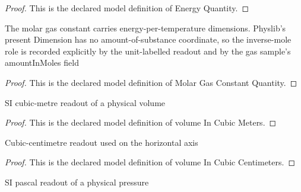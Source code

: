 \begin{proof}
  This is the declared model definition of Energy Quantity.
\end{proof}
\begin{definition}
  \label{def:physics:phyx-mini-0415:phyxminiproblems-problemphyxmini0415-molargasconstantquantity}
  The molar gas constant carries energy-per-temperature dimensions. Physlib's present Dimension has no amount-of-substance coordinate, so the inverse-mole role is recorded explicitly by the unit-labelled readout and by the gas sample's amountInMoles field
\end{definition}
\begin{proof}
  This is the declared model definition of Molar Gas Constant Quantity.
\end{proof}
\begin{definition}
  \label{def:physics:phyx-mini-0415:phyxminiproblems-problemphyxmini0415-volumeincubicmeters}
  SI cubic-metre readout of a physical volume
\end{definition}
\begin{proof}
  This is the declared model definition of volume In Cubic Meters.
\end{proof}
\begin{definition}
  \label{def:physics:phyx-mini-0415:phyxminiproblems-problemphyxmini0415-volumeincubiccentimeters}
  Cubic-centimetre readout used on the horizontal axis
\end{definition}
\begin{proof}
  This is the declared model definition of volume In Cubic Centimeters.
\end{proof}
\begin{definition}
  \label{def:physics:phyx-mini-0415:phyxminiproblems-problemphyxmini0415-pressureinpascals}
  SI pascal readout of a physical pressure
\end{definition}
